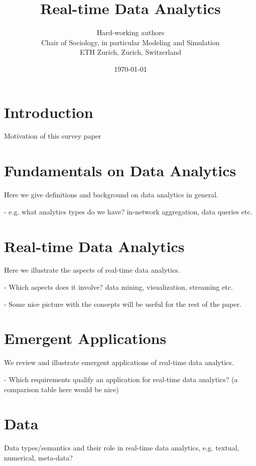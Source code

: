 \documentclass[10pt,twoside,twocolumn]{article}
\begin{document}
\title{Real-time Data Analytics}
\author{Hard-working authors\\
Chair of Sociology, in particular Modeling and Simulation\\
ETH Zurich, Zurich, Switzerland
}
\date{\today}
\maketitle

\section{Introduction}

Motivation of this survey paper~\cite{Hatamlou2014}

\section{Fundamentals on Data Analytics}

Here we give definitions and background on data analytics in general. 

- e.g. what analytics types do we have? in-network aggregation, data queries etc. 

\section{Real-time Data Analytics}

Here we illustrate the aspects of real-time data analytics. 

- Which aspects does it involve? data mining, visualization, streaming etc.

- Some nice picture with the concepts will be useful for the rest of the paper.

\section{Emergent Applications}

We review and illustrate emergent applications of real-time data analytics.

- Which requirements qualify an application for real-time data analytics? (a comparison table here would be nice)

\section{Data}

Data types/semantics and their role in real-time data analytics, e.g. textual, numerical, meta-data?
\end{document}
